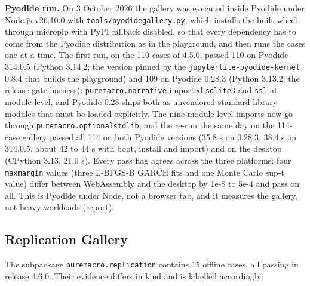 \documentclass[11pt,letterpaper]{article}
\renewcommand{\_}{\pmunderscore\allowbreak}
\begin{document}
\textbf{Pyodide run.} On 3 October 2026 the gallery was executed inside Pyodide under Node.js v26.10.0 with \texttt{tools/pyodide\_gallery.py}, which installs the built wheel through micropip with PyPI fallback disabled, so that every dependency has to come from the Pyodide distribution as in the playground, and then runs the cases one at a time. The first run, on the 110 cases of 4.5.0, passed 110 on Pyodide 314.0.5 (Python 3.14.2; the version pinned by the \texttt{jupyterlite-pyodide-kernel} 0.8.4 that builds the playground) and 109 on Pyodide 0.28.3 (Python 3.13.2; the release-gate harness): \texttt{puremacro.narrative} imported \texttt{sqlite3} and \texttt{ssl} at module level, and Pyodide 0.28 ships both as unvendored standard-library modules that must be loaded explicitly. The nine module-level imports now go through \texttt{puremacro.\_optional\_stdlib}, and the re-run the same day on the 114-case gallery passed all 114 on both Pyodide versions (35.8 s on 0.28.3, 38.4 s on 314.0.5, about 42 to 44 s with boot, install and import) and on the desktop (CPython 3.13, 21.0 s). Every pass flag agrees across the three platforms; four \texttt{max\_margin} values (three L-BFGS-B GARCH fits and one Monte Carlo sup-t value) differ between WebAssembly and the desktop by 1e-8 to 5e-4 and pass on all. This is Pyodide under Node, not a browser tab, and it measures the gallery, not heavy workloads (\href{https://github.com/jalonso1979/puremacro/blob/v4.6.0/reviews/2026-10-03-pyodide-gallery/REPORT.md}{report}).

\subsection{Replication Gallery}\label{replication-gallery}

The subpackage \texttt{puremacro.replication} contains 15 offline cases, all passing in release 4.6.0. Their evidence differs in kind and is labelled accordingly:
\end{document}
